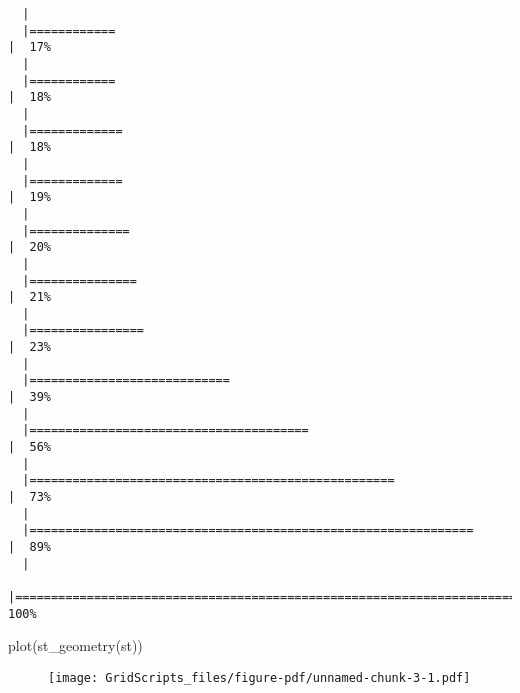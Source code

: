 \documentclass[
  letterpaper,
]{book}
\newenvironment{Shaded}{\begin{snugshade}}{\end{snugshade}}
\newcommand{\FunctionTok}[1]{\textcolor[rgb]{0.28,0.35,0.67}{#1}}
\newcommand{\NormalTok}[1]{\textcolor[rgb]{0.00,0.23,0.31}{#1}}
\begin{document}
\begin{verbatim}
  |                                                                            
  |============                                                          |  17%
  |                                                                            
  |============                                                          |  18%
  |                                                                            
  |=============                                                         |  18%
  |                                                                            
  |=============                                                         |  19%
  |                                                                            
  |==============                                                        |  20%
  |                                                                            
  |===============                                                       |  21%
  |                                                                            
  |================                                                      |  23%
  |                                                                            
  |============================                                          |  39%
  |                                                                            
  |=======================================                               |  56%
  |                                                                            
  |===================================================                   |  73%
  |                                                                            
  |==============================================================        |  89%
  |                                                                            
  |======================================================================| 100%
\end{verbatim}

\begin{Shaded}
\begin{Highlighting}[]
\FunctionTok{plot}\NormalTok{(}\FunctionTok{st\_geometry}\NormalTok{(st))}
\end{Highlighting}
\end{Shaded}

\begin{figure}[H]

{\centering \texttt{[image: GridScripts\_files/figure-pdf/unnamed-chunk-3-1.pdf]}

}

\end{figure}
\end{document}

